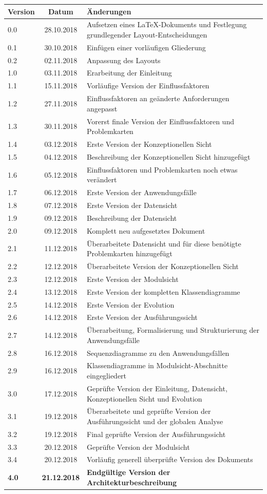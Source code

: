 \documentclass[enabledeprecatedfontcommands,fontsize=11pt,paper=a4,twoside]{scrartcl}
\newcounter{one}
\begin{document}
\begin{tabular}{p{}cp{12cm}}
Version & Datum & Änderungen \\
\hline
0.0 & 28.10.2018 & Aufsetzen eines LaTeX-Dokuments und Festlegung grundlegender Layout-Entscheidungen \\
0.1 & 30.10.2018 & Einfügen einer vorläufigen Gliederung \\
0.2 & 02.11.2018 & Anpassung des Layouts \\
1.0 & 03.11.2018 & Erarbeitung der Einleitung \\
1.1 & 15.11.2018 & Vorläufige Version der Einflussfaktoren \\
1.2 & 27.11.2018 & Einflussfaktoren an geänderte Anforderungen angepasst \\
1.3 & 30.11.2018 & Vorerst finale Version der Einflussfaktoren und Problemkarten  \\
1.4 & 03.12.2018 & Erste Version der Konzeptionellen Sicht\\
1.5 & 04.12.2018 & Beschreibung der Konzeptionellen Sicht hinzugefügt\\
1.6 & 05.12.2018 & Einflussfaktoren und Problemkarten noch etwas verändert \\
1.7 & 06.12.2018 & Erste Version der Anwendungsfälle \\
1.8 & 07.12.2018 & Erste Version der Datensicht \\
1.9 & 09.12.2018 & Beschreibung der Datensicht \\
2.0 & 09.12.2018 & Komplett neu aufgesetztes Dokument \\
2.1 & 11.12.2018 & Überarbeitete Datensicht und für diese benötigte Problemkarten hinzugefügt\\
2.2 & 12.12.2018 & Überarbeitete Version der Konzeptionellen Sicht \\
2.3 & 12.12.2018 & Erste Version der Modulsicht \\
2.4 & 13.12.2018 & Erste Version der kompletten Klassendiagramme \\
2.5 & 14.12.2018 & Erste Version der Evolution \\
2.6 & 14.12.2018 & Erste Version der Ausführungssicht \\
2.7 & 14.12.2018 & Überarbeitung, Formalisierung und Strukturierung der Anwendungsfälle \\
2.8 & 16.12.2018 & Sequenzdiagramme zu den Anwendungsfällen \\
2.9 & 16.12.2018 & Klassendiagramme in Modulsicht-Abschnitte eingegliedert \\
3.0 & 17.12.2018 & Geprüfte Version der Einleitung, Datensicht, Konzeptionellen Sicht und Evolution\\
3.1 & 19.12.2018 & Überarbeitete und geprüfte Version der Ausführungssicht und der globalen Analyse\\
3.2 & 19.12.2018 & Final geprüfte Version der Ausführungssicht \\
3.3 & 20.12.2018 & Geprüfte Version der Modulsicht \\
3.4 & 20.12.2018 & Vorläufig generell überprüfte Version des Dokuments \\
\textbf{4.0} & \textbf{21.12.2018} & \textbf{Endgültige Version der Architekturbeschreibung} \\



\end{tabular}
\end{document}
